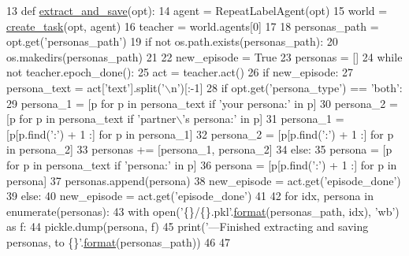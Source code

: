 \begin{DoxyCode}
13 \textcolor{keyword}{def }\hyperlink{namespacepersonachat__eval_1_1extract__and__save__personas_a7bae99c34a0b3f49cbce1328146926fd}{extract\_and\_save}(opt):
14     agent = RepeatLabelAgent(opt)
15     world = \hyperlink{namespaceparlai_1_1core_1_1worlds_a11923c10b545c7ecc1b08fe2242d9c2c}{create\_task}(opt, agent)
16     teacher = world.agents[0]
17 
18     personas\_path = opt.get(\textcolor{stringliteral}{'personas\_path'})
19     \textcolor{keywordflow}{if} \textcolor{keywordflow}{not} os.path.exists(personas\_path):
20         os.makedirs(personas\_path)
21 
22     new\_episode = \textcolor{keyword}{True}
23     personas = []
24     \textcolor{keywordflow}{while} \textcolor{keywordflow}{not} teacher.epoch\_done():
25         act = teacher.act()
26         \textcolor{keywordflow}{if} new\_episode:
27             persona\_text = act[\textcolor{stringliteral}{'text'}].split(\textcolor{stringliteral}{'\(\backslash\)n'})[:-1]
28             \textcolor{keywordflow}{if} opt.get(\textcolor{stringliteral}{'persona\_type'}) == \textcolor{stringliteral}{'both'}:
29                 persona\_1 = [p \textcolor{keywordflow}{for} p \textcolor{keywordflow}{in} persona\_text \textcolor{keywordflow}{if} \textcolor{stringliteral}{'your persona:'} \textcolor{keywordflow}{in} p]
30                 persona\_2 = [p \textcolor{keywordflow}{for} p \textcolor{keywordflow}{in} persona\_text \textcolor{keywordflow}{if} \textcolor{stringliteral}{'partner\(\backslash\)'s persona:'} \textcolor{keywordflow}{in} p]
31                 persona\_1 = [p[p.find(\textcolor{stringliteral}{':'}) + 1 :] \textcolor{keywordflow}{for} p \textcolor{keywordflow}{in} persona\_1]
32                 persona\_2 = [p[p.find(\textcolor{stringliteral}{':'}) + 1 :] \textcolor{keywordflow}{for} p \textcolor{keywordflow}{in} persona\_2]
33                 personas += [persona\_1, persona\_2]
34             \textcolor{keywordflow}{else}:
35                 persona = [p \textcolor{keywordflow}{for} p \textcolor{keywordflow}{in} persona\_text \textcolor{keywordflow}{if} \textcolor{stringliteral}{'persona:'} \textcolor{keywordflow}{in} p]
36                 persona = [p[p.find(\textcolor{stringliteral}{':'}) + 1 :] \textcolor{keywordflow}{for} p \textcolor{keywordflow}{in} persona]
37                 personas.append(persona)
38             new\_episode = act.get(\textcolor{stringliteral}{'episode\_done'})
39         \textcolor{keywordflow}{else}:
40             new\_episode = act.get(\textcolor{stringliteral}{'episode\_done'})
41 
42     \textcolor{keywordflow}{for} idx, persona \textcolor{keywordflow}{in} enumerate(personas):
43         with open(\textcolor{stringliteral}{'\{\}/\{\}.pkl'}.\hyperlink{namespaceparlai_1_1chat__service_1_1services_1_1messenger_1_1shared__utils_a32e2e2022b824fbaf80c747160b52a76}{format}(personas\_path, idx), \textcolor{stringliteral}{'wb'}) \textcolor{keyword}{as} f:
44             pickle.dump(persona, f)
45     print(\textcolor{stringliteral}{'---Finished extracting and saving personas, to \{\}'}.\hyperlink{namespaceparlai_1_1chat__service_1_1services_1_1messenger_1_1shared__utils_a32e2e2022b824fbaf80c747160b52a76}{format}(personas\_path))
46 
47 
\end{DoxyCode}
